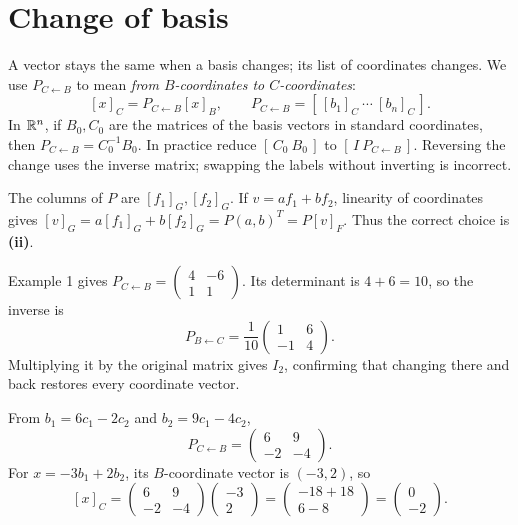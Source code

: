 \section{Change of basis}
A vector stays the same when a basis changes; its list of coordinates changes.
We use $P_{C\leftarrow B}$ to mean \emph{from $B$-coordinates to $C$-coordinates}:
\[
 [x]_C=P_{C\leftarrow B}[x]_B,
 \qquad P_{C\leftarrow B}=[\,[b_1]_C\ \cdots\ [b_n]_C\,].
\]
In $\mathbb{R}^n$, if $B_0,C_0$ are the matrices of the basis vectors in standard
coordinates, then $P_{C\leftarrow B}=C_0^{-1}B_0$. In practice reduce
$[\,C_0\ B_0\,]$ to $[\,I\ P_{C\leftarrow B}\,]$. Reversing the
change uses the inverse matrix; swapping the labels without inverting is incorrect.

The columns of $P$ are $[f_1]_G,[f_2]_G$. If
$v=af_1+bf_2$, linearity of coordinates gives
$[v]_G=a[f_1]_G+b[f_2]_G=P(a,b)^T=P[v]_F$.
Thus the correct choice is \textbf{(ii)}.

Example 1 gives $P_{C\leftarrow B}=\left(\begin{smallmatrix}4&-6\\1&1\end{smallmatrix}\right)$.
Its determinant is $4+6=10$, so the inverse is
\[
 P_{B\leftarrow C}=\frac1{10}\begin{pmatrix}1&6\\-1&4\end{pmatrix}.
\]
Multiplying it by the original matrix gives $I_2$, confirming that changing
there and back restores every coordinate vector.

From $b_1=6c_1-2c_2$ and $b_2=9c_1-4c_2$,
\[
 P_{C\leftarrow B}=\begin{pmatrix}6&9\\-2&-4\end{pmatrix}.
\]
For $x=-3b_1+2b_2$, its $B$-coordinate vector is $(-3,2)$, so
\[
 [x]_C=\begin{pmatrix}6&9\\-2&-4\end{pmatrix}
 \begin{pmatrix}-3\\2\end{pmatrix}=\begin{pmatrix}-18+18\\6-8\end{pmatrix}
 =\begin{pmatrix}0\\-2\end{pmatrix}.
\]

